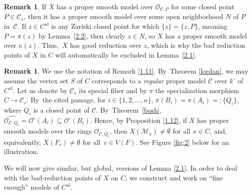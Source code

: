 \documentclass[10pt]{amsart}
\newcommand{\loccit}{the cited passage}
\newcommand{\al}{\mathrm{al}}
\theoremstyle{definition}
\newtheorem{rem}[thm]{Remark}
\begin{document}
\begin{rem} \label{2.3}
If $X$ has a proper smooth model over $\mathcal{O}_{\mathcal{C}, P}$ for some closed point ${P \in \mathcal{C}_s}$, then it has a proper smooth model over some open neighborhood $N$ of $P$ in~$\mathcal{C}$. If $z \in C^{\al}$ is any Zariski closed point for which $\overline{\{z\}}=\{z, P\}$, meaning $P=\pi(z)$ by Lemma~\ref{2.2}, then clearly $z \in N$, so $X$ has a proper smooth model over $\kappa(z)$. Thus,~$X$ has good reduction over $z$, which is why the bad reduction points of $X$ in $C$ will automatically be excluded in Lemma~\ref{2.1}.
\end{rem}

\begin{rem} \label{ecuditshme}
We use the notation of Remark \ref{1.11}. By~Theorem \ref{lordan}, we may assume the vertex set $S$ of $C$ corresponds to a \emph{regular} proper model $\mathscr{C}$ over $k^{\circ}$ of $C^{\al}$. Let us denote by $\mathscr{C}_s$ its special fiber and by $\pi$ the specialization morphism $C \to \mathscr{C}_s$. By~\loccit, for $i \in \{1,2,\dots, n\}$, ${\pi(B_i)=\pi(A_i)=:\{Q_i\}}$, where $Q_i$ is a closed point of $\mathscr{C}$. By~Theorem~\ref{bosh}, $\widehat{\mathcal{O}_{\mathscr{C}, Q_i}}=\mathcal{O}^{\circ}(A_i) \subseteq \mathcal{O}^{\circ}(B_i)$. Hence, by Proposition \ref{1.12}, if $X$ has proper smooth models over the rings $\mathcal{O}_{\mathscr{C}, Q_i}$, then $X(\mathscr{M}_x) \neq \emptyset$ for all $x \in C$, and, equivalently, $X(F_v) \neq \emptyset$ for all~${v \in V(F)}$. See Figure \ref{fig:2} below for an illustration.
\end{rem}

We will now give similar, but global, versions of Lemma \ref{2.1}. In order to deal with the bad-reduction points of $X$ on $C$, we construct and work on ``fine enough'' models of $C^{\al}$.
\end{document}
